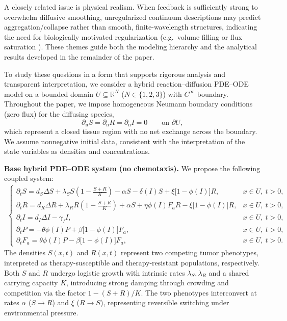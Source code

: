 \documentclass[pdflatex,sn-mathphys-ay]{sn-jnl}
\theoremstyle{thmstyleone}
\theoremstyle{definition}
\theoremstyle{remark}
\begin{document}
A closely related issue is physical realism. 
When feedback is sufficiently strong to overwhelm diffusive smoothing, unregularized continuum descriptions may predict aggregation/collapse rather than smooth, finite-wavelength structures, indicating the need for biologically motivated regularization (e.g.\ volume filling \citep{wrzosek2010volume,liu2026ftu} or flux saturation \citep{chertock2012chemotaxis,liu2026computational}). 
These themes guide both the modeling hierarchy and the analytical results developed in the remainder of the paper.

To study these questions in a form that supports rigorous analysis and transparent interpretation, we consider a hybrid reaction--diffusion PDE--ODE model on a bounded domain $U\subseteq\mathbb{R}^N$ ($N\in\{1,2,3\}$) with $C^\infty$ boundary. 
Throughout the paper, we impose homogeneous Neumann boundary conditions (zero flux) for the diffusing species,
\[
\partial_{\mathrm n}S=\partial_{\mathrm n}R=\partial_{\mathrm n}I=0
\qquad \text{on }\partial U,
\]
which represent a closed tissue region with no net exchange across the boundary. 
We assume nonnegative initial data, consistent with the interpretation of the state variables as densities and concentrations.

\medskip
\noindent\textbf{Base hybrid PDE--ODE system (no chemotaxis).}
We propose the following coupled system:
\begin{align}
\label{eq:system}
\begin{cases}
\partial_{t} S = d_{S}\Delta S + \lambda_{S} S \left(1 - \tfrac{S+R}{K}\right) - \alpha S - \delta(I)S + \xi \bigl[1 - \phi(I)\bigr]R, & x\in U,\ t>0, \\[4pt]
\partial_{t} R = d_{R}\Delta R + \lambda_{R} R \left(1 - \tfrac{S+R}{K}\right) + \alpha S + \eta \phi(I)F_aR - \xi \bigl[1 - \phi(I)\bigr]R, & x\in U,\ t>0, \\[4pt]
\partial_{t} I = d_{I}\Delta I - \gamma_{I}I, & x\in U,\ t>0, \\[4pt]
\partial_{t} P = -\theta \phi(I)P + \beta \bigl[1 - \phi(I)\bigr]F_a, & x \in U,\ t>0, \\[4pt]
\partial_{t} F_a = \theta \phi(I)P - \beta \bigl[1 - \phi(I)\bigr]F_a, & x \in U,\ t>0.
\end{cases}
\end{align}
The densities $S(x,t)$ and $R(x,t)$ represent two competing tumor phenotypes, interpreted as therapy-susceptible and therapy-resistant populations, respectively. 
Both $S$ and $R$ undergo logistic growth with intrinsic rates $\lambda_S,\lambda_R$ and a shared carrying capacity $K$, introducing strong damping through crowding and competition via the factor $1-(S+R)/K$.
The two phenotypes interconvert at rates $\alpha$ ($S\to R$) and $\xi$ ($R\to S$), representing reversible switching under environmental pressure.
\end{document}
